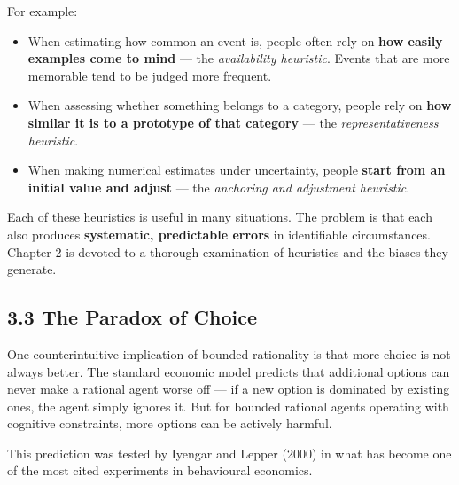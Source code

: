 \documentclass[12pt, letterpaper]{article}
\begin{document}
For example:
\begin{itemize}
\item When estimating how common an event is, people often rely on \textbf{how easily examples come to mind} --- the \textit{availability heuristic}. Events that are more memorable tend to be judged more frequent.
\item When assessing whether something belongs to a category, people rely on \textbf{how similar it is to a prototype of that category} --- the \textit{representativeness heuristic}.
\item When making numerical estimates under uncertainty, people \textbf{start from an initial value and adjust} --- the \textit{anchoring and adjustment heuristic}.
\end{itemize}

Each of these heuristics is useful in many situations. The problem is that each also produces \textbf{systematic, predictable errors} in identifiable circumstances. Chapter 2 is devoted to a thorough examination of heuristics and the biases they generate.

\medskip


\subsection{3.3 The Paradox of Choice}


One counterintuitive implication of bounded rationality is that more choice is not always better. The standard economic model predicts that additional options can never make a rational agent worse off --- if a new option is dominated by existing ones, the agent simply ignores it. But for bounded rational agents operating with cognitive constraints, more options can be actively harmful.

This prediction was tested by Iyengar and Lepper (2000) in what has become one of the most cited experiments in behavioural economics.
\end{document}
